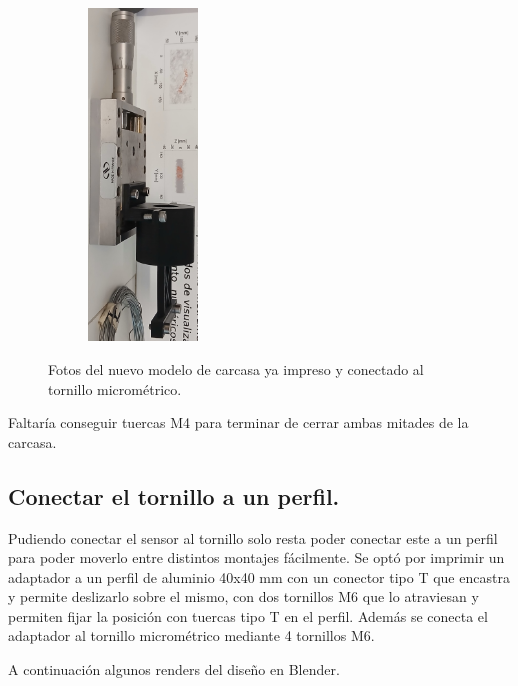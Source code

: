 \begin{figure}[!ht]
\begin{minipage}[c]{0.293054\textwidth}
			\begin{subfigure}{\textwidth}
				\centering
				\includegraphics[height=250pt]{Figures/21_04_2025/Vista_3_4_impresa.jpg}
				\captionsetup{width=0.8\textwidth}
			\end{subfigure}
		\end{minipage}
	\caption{Fotos del nuevo modelo de carcasa ya impreso y conectado al tornillo micrométrico.} %
	\label{fig:}
\end{figure}

Faltaría conseguir tuercas M4 para terminar de cerrar ambas mitades de la carcasa.

\subsection*{Conectar el tornillo a un perfil.}
Pudiendo conectar el sensor al tornillo solo resta poder conectar este a un perfil para poder moverlo entre distintos montajes fácilmente. Se optó por imprimir un adaptador a un perfil de aluminio 40x40 mm con un conector tipo T que encastra y permite deslizarlo sobre el mismo, con dos tornillos M6 que lo atraviesan y permiten fijar la posición con tuercas tipo T en el perfil. Además se conecta el adaptador al tornillo micrométrico mediante 4 tornillos M6. 

A continuación algunos renders del diseño en Blender.

